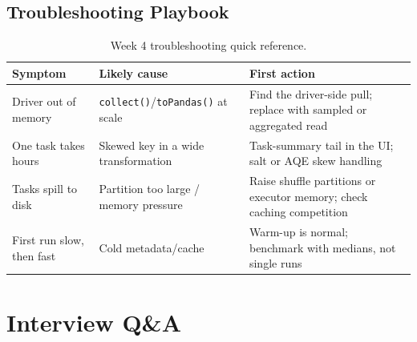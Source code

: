 \subsection{Troubleshooting Playbook}
\begin{table}[H]
\centering
\small
\begin{tabular}{@{}p{3.6cm}p{4.2cm}p{4.8cm}@{}}
\toprule
\textbf{Symptom} & \textbf{Likely cause} & \textbf{First action} \\
\midrule
Driver out of memory & \texttt{collect()}/\texttt{toPandas()} at scale & Find the driver-side pull; replace with sampled or aggregated read \\
One task takes hours & Skewed key in a wide transformation & Task-summary tail in the UI; salt or AQE skew handling \\
Tasks spill to disk & Partition too large / memory pressure & Raise shuffle partitions or executor memory; check caching competition \\
First run slow, then fast & Cold metadata/cache & Warm-up is normal; benchmark with medians, not single runs \\
\bottomrule
\end{tabular}
\caption{Week 4 troubleshooting quick reference.}
\label{tab:ch4-trouble}
\end{table}

\section{Interview Q\&A}
